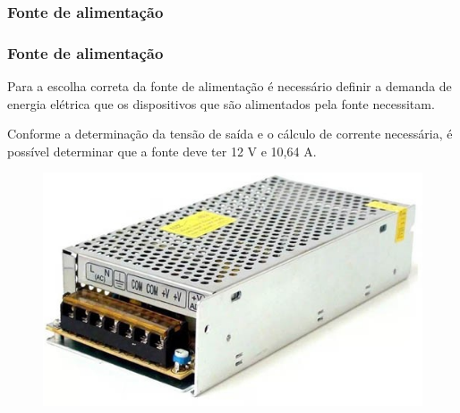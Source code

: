 \subsubsection{Fonte de alimentação}

\begin{frame}
\frametitle{Fonte de alimentação}

Para a escolha correta da fonte de alimentação é necessário definir a demanda de energia elétrica que os dispositivos que são alimentados pela fonte necessitam.

Conforme a determinação da tensão de saída e o cálculo de corrente necessária, é possível determinar que a fonte deve ter 12 V e 10,64 A.

\begin{figure}
\centering
\includegraphics[scale = 0.30]{figuras/fonte}
\end{figure}

\end{frame}
